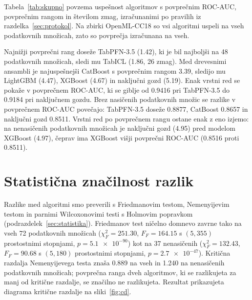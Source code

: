 \documentclass[a4paper,12pt,openright]{book}
\begin{document}
Tabela~\ref{tab:skupno} povzema uspešnost algoritmov s povprečnim ROC-AUC,
povprečnim rangom in številom zmag, izračunanimi po pravilih iz
razdelka~\ref{sec:protokol}. Na zbirki OpenML-CC18 so vsi algoritmi uspeli na
vseh podatkovnih množicah, zato so povprečja izračunana na vseh.



Najnižji povprečni rang doseže TabPFN-3.5 (\num{1.42}), ki je bil najboljši na
48 podatkovnih množicah, sledi mu TabICL (\num{1.86}, 26 zmag). Med drevesnimi
ansambli je najuspešnejši CatBoost s povprečnim rangom \num{3.39}, sledijo mu
LightGBM (\num{4.47}), XGBoost (\num{4.67}) in naključni gozd (\num{5.19}). Enak
vrstni red se pokaže v povprečnem ROC-AUC, ki se giblje od \num{0.9416} pri
TabPFN-3.5 do \num{0.9184} pri naključnem gozdu. Brez nasičenih podatkovnih
množic se razlike v povprečnem ROC-AUC povečajo: TabPFN-3.5 doseže \num{0.8877},
CatBoost \num{0.8657} in naključni gozd \num{0.8511}. Vrstni red po povprečnem
rangu ostane enak z eno izjemo: na nenasičenih podatkovnih množicah je naključni
gozd (\num{4.95}) pred modelom XGBoost (\num{4.97}), čeprav ima XGBoost višji
povprečni ROC-AUC (\num{0.8516} proti \num{0.8511}).

\section{Statistična značilnost razlik}
\label{sec:rez-znacilnost}

Razlike med algoritmi smo preverili s Friedmanovim testom, Nemenyijevim
testom in parnimi Wilcoxonovimi testi s Holmovim popravkom
(podrazdelek~\ref{sec:statistika}). Friedmanov test ničelno domnevo zavrne tako na vseh 72 podatkovnih množicah
($\chi^2_F = \num{251.30}$, $F_F = \num{164.15}$ s $(5, 355)$ prostostnimi
stopnjami, $p = \num{5.1e-90}$) kot na 37 nenasičenih ($\chi^2_F =
\num{132.43}$, $F_F = \num{90.68}$ s $(5, 180)$ prostostnimi stopnjami, $p =
\num{2.7e-47}$). Kritična razdalja Nemenyijevega testa znaša \num{0.889} na vseh
in \num{1.240} na nenasičenih podatkovnih množicah; povprečna ranga dveh
algoritmov, ki se razlikujeta za manj od kritične razdalje, se značilno ne
razlikujeta. Rezultat prikazujeta diagrama kritične razdalje na
sliki~\ref{fig:cd}.
\end{document}
